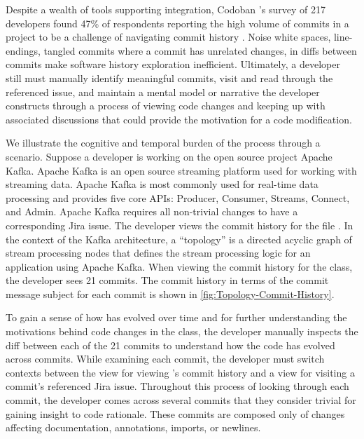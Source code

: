 Despite a wealth of tools supporting  integration, Codoban \etal's survey of 217 developers found 47\% of respondents reporting the high volume of commits in a project to be a challenge of navigating commit history \cite{codoban_software_2015}. 
Noise \eg white spaces, line-endings, tangled commits where a commit has unrelated changes, \etc in diffs between commits make software history exploration inefficient. 
Ultimately, a developer still must manually identify meaningful commits, visit and read through the referenced issue, and maintain a mental model or narrative the developer constructs through a process of viewing code changes and keeping up with associated discussions that could provide the motivation for a code modification. 

We illustrate the cognitive and temporal burden of the process through a scenario.
Suppose a developer is working on the open source project Apache Kafka. 
Apache Kafka is an open source streaming platform used for working with streaming data. Apache Kafka is most commonly used for real-time data processing and provides five core APIs: Producer, Consumer, Streams, Connect, and Admin.
Apache Kafka requires all non-trivial changes to have a corresponding Jira issue. 
The developer views the commit history for the file .
In the context of the Kafka architecture, a ``topology'' is a directed acyclic graph of stream processing nodes that defines the stream processing logic for an application using Apache Kafka.
When viewing the commit history for the  class, the developer sees 21 commits.
The commit history in terms of the commit message subject for each commit is shown in \autoref{fig:Topology-Commit-History}.

To gain a sense of how  has evolved over time and for further understanding the motivations behind code changes in the class, the developer manually inspects the diff between each of the 21 commits to understand how the code has evolved across commits.
While examining each commit, the developer must switch contexts between the view for viewing 's commit history and a view for visiting a commit's referenced Jira issue.
Throughout this process of looking through each commit, the developer comes across several commits that they consider trivial for gaining insight to code rationale. 
These commits are composed only of changes affecting documentation, annotations, imports, or newlines. 

